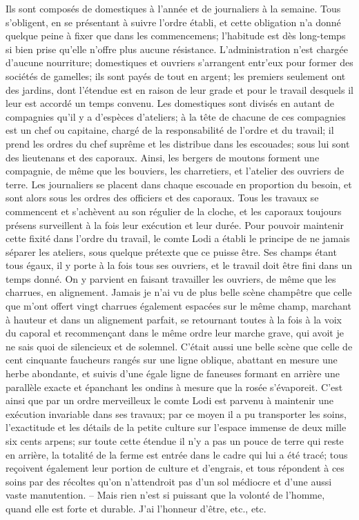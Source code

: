 Ils sont composés de domestiques à l'année et de journaliers à la semaine. Tous s'obligent, en se présentant à suivre l'ordre établi, et cette obligation n'a donné quelque peine à fixer que dans les commencemens; l'habitude est dès long-temps si bien prise qu'elle n'offre plus aucune résistance.
L'administration n'est chargée d'aucune nourriture; domestiques et ouvriers s'arrangent entr'eux pour former des sociétés de gamelles; ils sont payés de tout en argent; les premiers seulement ont des jardins, dont l'étendue est en raison de leur grade et pour le travail desquels il leur est accordé un temps convenu.
Les domestiques sont divisés en autant de\setcounter{page}{433} compagnies qu'il y a d'espèces d'ateliers; à la tête de chacune de ces compagnies est un chef ou capitaine, chargé de la responsabilité de l'ordre et du travail; il prend les ordres du chef suprême et les distribue dans les escouades; sous lui sont des lieutenans et des caporaux. Ainsi, les bergers de moutons forment une compagnie, de même que les bouviers, les charretiers, et l'atelier des ouvriers de terre. Les journaliers se placent dans chaque escouade en proportion du besoin, et sont alors sous les ordres des officiers et des caporaux. Tous les travaux se commencent et s'achèvent au son régulier de la cloche, et les caporaux toujours présens surveillent à la fois leur exécution et leur durée.
Pour pouvoir maintenir cette fixité dans l'ordre du travail, le comte Lodi a établi le principe de ne jamais séparer les ateliers, sous quelque prétexte que ce puisse être. Ses champs étant tous égaux, il y porte à la fois tous ses ouvriers, et le travail doit être fini dans un temps donné. On y parvient en faisant travailler les ouvriers, de même que les charrues, en alignement. Jamais je n'ai vu de plus belle scène champêtre que celle que m'ont offert vingt charrues également espacées sur le même champ, marchant à hauteur et\setcounter{page}{434} dans un alignement parfait, se retournant toutes à la fois à la voix du caporal et recommençant dans le même ordre leur marche grave, qui avoit je ne sais quoi de silencieux et de solemnel. C'était aussi une belle scène que celle de cent cinquante faucheurs rangés sur une ligne oblique, abattant en mesure une herbe abondante, et suivis d'une égale ligne de faneuses formant en arrière une parallèle exacte et épanchant les ondins à mesure que la rosée s'évaporeit.
C'est ainsi que par un ordre merveilleux le comte Lodi est parvenu à maintenir une exécution invariable dans ses travaux; par ce moyen il a pu transporter les soins, l'exactitude et les détails de la petite culture sur l'espace immense de deux mille six cents arpens; sur toute cette étendue il n'y a pas un pouce de terre qui reste en arrière, la totalité de la ferme est entrée dans le cadre qui lui a été tracé; tous reçoivent également leur portion de culture et d'engrais, et tous répondent à ces soins par des récoltes qu'on n'attendroit pas d'un sol médiocre et d'une aussi vaste manutention. -- Mais rien n'est si puissant que la volonté de l'homme, quand elle est forte et durable.
J'ai l'honneur d'être, etc., etc.